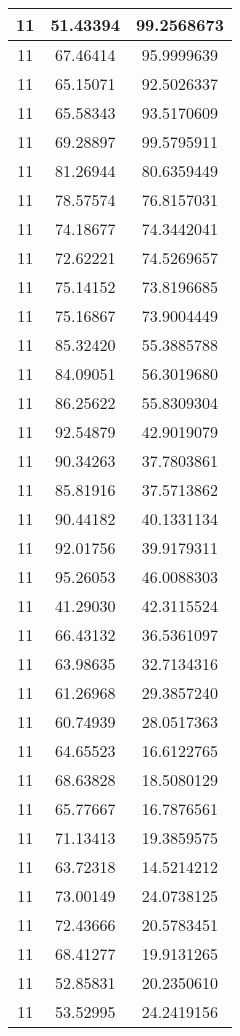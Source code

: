 \documentclass[
]{book}
\begin{document}
\begin{tabular}{c|c|c}
\hline
11 & 51.43394 & 99.2568673\\
\hline
11 & 67.46414 & 95.9999639\\
\hline
11 & 65.15071 & 92.5026337\\
\hline
11 & 65.58343 & 93.5170609\\
\hline
11 & 69.28897 & 99.5795911\\
\hline
11 & 81.26944 & 80.6359449\\
\hline
11 & 78.57574 & 76.8157031\\
\hline
11 & 74.18677 & 74.3442041\\
\hline
11 & 72.62221 & 74.5269657\\
\hline
11 & 75.14152 & 73.8196685\\
\hline
11 & 75.16867 & 73.9004449\\
\hline
11 & 85.32420 & 55.3885788\\
\hline
11 & 84.09051 & 56.3019680\\
\hline
11 & 86.25622 & 55.8309304\\
\hline
11 & 92.54879 & 42.9019079\\
\hline
11 & 90.34263 & 37.7803861\\
\hline
11 & 85.81916 & 37.5713862\\
\hline
11 & 90.44182 & 40.1331134\\
\hline
11 & 92.01756 & 39.9179311\\
\hline
11 & 95.26053 & 46.0088303\\
\hline
11 & 41.29030 & 42.3115524\\
\hline
11 & 66.43132 & 36.5361097\\
\hline
11 & 63.98635 & 32.7134316\\
\hline
11 & 61.26968 & 29.3857240\\
\hline
11 & 60.74939 & 28.0517363\\
\hline
11 & 64.65523 & 16.6122765\\
\hline
11 & 68.63828 & 18.5080129\\
\hline
11 & 65.77667 & 16.7876561\\
\hline
11 & 71.13413 & 19.3859575\\
\hline
11 & 63.72318 & 14.5214212\\
\hline
11 & 73.00149 & 24.0738125\\
\hline
11 & 72.43666 & 20.5783451\\
\hline
11 & 68.41277 & 19.9131265\\
\hline
11 & 52.85831 & 20.2350610\\
\hline
11 & 53.52995 & 24.2419156\\

\end{tabular}
\end{document}
